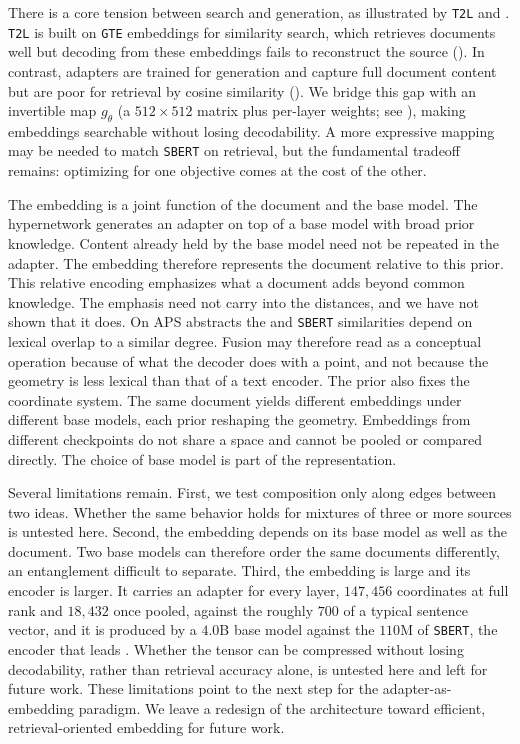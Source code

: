 There is a core tension between search and generation, as illustrated by \texttt{T2L} and \doctolora.
\texttt{T2L} is built on \texttt{GTE} embeddings for similarity search, which retrieves documents well but decoding from these embeddings fails to reconstruct the source (). In contrast, \doctolora adapters are trained for generation and capture full document content but are poor for retrieval by cosine similarity (). 
We bridge this gap with an invertible map $g_\theta$ (a $512\times512$ matrix plus per-layer weights; see ), making \doctolora embeddings searchable without losing decodability. A more expressive mapping may be needed to match \texttt{SBERT} on retrieval, but the fundamental tradeoff remains: optimizing for one objective comes at the cost of the other.

The \doctolora embedding is a joint function of the document and the base model. The hypernetwork generates an adapter on top of a base model with broad prior knowledge. Content already held by the base model need not be repeated in the adapter. The embedding therefore represents the document relative to this prior. This relative encoding emphasizes what a document adds beyond common knowledge. The emphasis need not carry into the distances, and we have not shown that it does. On APS abstracts the \doctolora and \texttt{SBERT} similarities depend on lexical overlap to a similar degree. Fusion may therefore read as a conceptual operation because of what the decoder does with a point, and not because the geometry is less lexical than that of a text encoder. The prior also fixes the coordinate system. The same document yields different embeddings under different base models, each prior reshaping the geometry. Embeddings from different checkpoints do not share a space and cannot be pooled or compared directly. The choice of base model is part of the representation.

Several limitations remain.
First, we test composition only along edges between two ideas. Whether the same behavior holds for mixtures of three or more sources is untested here.
Second, the embedding depends on its base model as well as the document.
Two base models can therefore order the same documents differently, an entanglement difficult to separate.
Third, the embedding is large and its encoder is larger. It carries an adapter for every layer, $147{,}456$ coordinates at full rank and $18{,}432$ once pooled, against the roughly $700$ of a typical sentence vector, and it is produced by a $4.0$B base model against the $110$M of \texttt{SBERT}, the encoder that leads .
Whether the tensor can be compressed without losing decodability, rather than retrieval accuracy alone, is untested here and left for future work.
These limitations point to the next step for the adapter-as-embedding paradigm.
We leave a redesign of the architecture toward efficient, retrieval-oriented embedding for future work.

